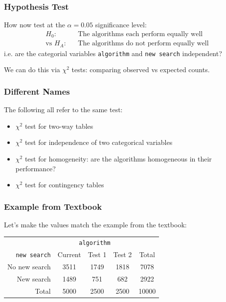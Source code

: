 \documentclass[slides]{beamer}
\newcommand{\blue}[1]{\textcolor{blue2}{#1}}
\begin{document}
\begin{frame}
\frametitle{Hypothesis Test}
How now test at the $\alpha=0.05$ significance level:
\begin{eqnarray*}
H_0:&& \mbox{The algorithms each perform equally well}\\
\mbox{vs } H_A:&& \mbox{The algorithms do not perform equally well}
\end{eqnarray*}
i.e. are the categorial variables {\tt algorithm} and {\tt new search} independent? 

\vspace{0.5cm}

\pause We can do this via $\chi^2$ tests: \blue{comparing observed vs expected counts}.

\end{frame}


\begin{frame}
\frametitle{Different Names}

The following all refer to the same test:
\begin{itemize}
\pause\item $\chi^2$ test for \blue{two-way tables}
\pause\item $\chi^2$ test for \blue{independence} of two categorical variables
\pause\item $\chi^2$ test for \blue{homogeneity}:  are the algorithms homogeneous in their performance?
\pause\item $\chi^2$ test for \blue{contingency tables}
\end{itemize}

\end{frame}


\begin{frame}
\frametitle{Example from Textbook}

Let's make the values match the example from the textbook:
\begin{center}
  \begin{tabular}{r|ccc|c}
& \multicolumn{3}{c|}{{\tt algorithm}} & \\
       {\tt new search} & Current & Test 1 & Test 2 & Total \\ 
\hline
    No new search & 3511 & 1749 & 1818 & 7078 \\ 
    New search & 1489 & 751 & 682 & 2922 \\ 
\hline
    Total & 5000 & 2500 & 2500 & 10000 \\ 
  \end{tabular}
\end{center}


\end{frame}
\end{document}
